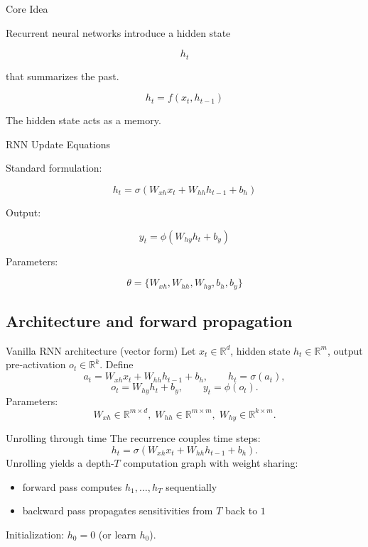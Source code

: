 \documentclass{beamer}
\begin{document}
\begin{frame}{Core Idea}

Recurrent neural networks introduce a hidden state

\[
h_t
\]

that summarizes the past.

\[
h_t = f(x_t,h_{t-1})
\]

The hidden state acts as a memory.
\end{frame}

\begin{frame}{RNN Update Equations}

Standard formulation:

\[
h_t = \sigma(W_{xh}x_t + W_{hh}h_{t-1} + b_h)
\]

Output:

\[
y_t = \phi(W_{hy}h_t + b_y)
\]

Parameters:

\[
\theta = \{W_{xh},W_{hh},W_{hy},b_h,b_y\}
\]
\end{frame}


\subsection{Architecture and forward propagation}

\begin{frame}{Vanilla RNN architecture (vector form)}
Let \(x_t\in\mathbb{R}^d\), hidden state \(h_t\in\mathbb{R}^m\), output pre-activation \(o_t\in\mathbb{R}^k\).
Define
\[
a_t = W_{xh}x_t + W_{hh}h_{t-1} + b_h,\qquad h_t = \sigma(a_t),
\]
\[
o_t = W_{hy}h_t + b_y,\qquad y_t = \phi(o_t).
\]
Parameters:
\[
W_{xh}\in\mathbb{R}^{m\times d},\;
W_{hh}\in\mathbb{R}^{m\times m},\;
W_{hy}\in\mathbb{R}^{k\times m}.
\]
\end{frame}

\begin{frame}{Unrolling through time}
The recurrence couples time steps:
\[
h_t = \sigma(W_{xh}x_t + W_{hh}h_{t-1}+b_h).
\]
Unrolling yields a depth-\(T\) computation graph with weight sharing:
\begin{itemize}
\item forward pass computes \(h_1,\dots,h_T\) sequentially
\item backward pass propagates sensitivities from \(T\) back to \(1\)
\end{itemize}

Initialization: \(h_0=0\) (or learn \(h_0\)).
\end{frame}
\end{document}
